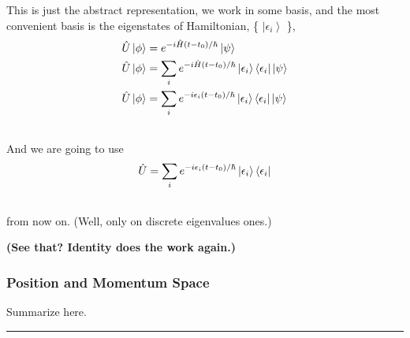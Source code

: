 \documentclass[letterpaper,10pt,english]{sphinxmanual}
\newcommand{\bra}[1]{\left\langle #1\right|}
\newcommand{\ket}[1]{\left| #1\right\rangle}
\begin{document}
\begin{itemize}
This is just the abstract representation, we work in some basis, and the most convenient basis is the eigenstates of Hamiltonian, \{ $\ket{\epsilon_i}$ \},
\begin{gather}
\begin{split}\hat U \ket{\phi} & =  e^{- i \hat H (t-t_0)/\hbar} \ket{\psi}   \\
\hat U \ket{\phi} & =  \sum_i e^{- i \hat H (t-t_0)/\hbar} \ket{\epsilon_i}\bra{\epsilon_i}  \ket{\psi}  \\
      \hat U \ket{\phi} & =  \sum_i e^{- i \epsilon_i (t-t_0)/\hbar} \ket{\epsilon_i}\bra{\epsilon_i}  \ket{\psi}\end{split}\notag\\\begin{split}\end{split}\notag
\end{gather}
And we are going to use
\begin{gather}
\begin{split}\hat U = \sum_i e^{- i \epsilon_i (t-t_0)/\hbar} \ket{\epsilon_i}\bra{\epsilon_i}\end{split}\notag\\\begin{split}\end{split}\notag
\end{gather}
from now on. (Well, only on discrete eigenvalues ones.)

\textbf{(See that? Identity does the work again.)}

\end{itemize}


\subsubsection{Position and Momentum Space}
\label{QuantumMechanics:position-and-momentum-space}
Summarize here.


\bigskip\hrule{}\bigskip
\end{document}
